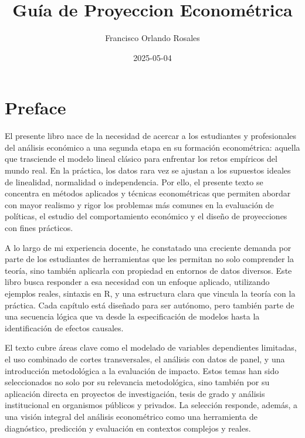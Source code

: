 \documentclass[
  letterpaper,
  DIV=11,
  numbers=noendperiod]{scrreprt}
\title{Guía de Proyeccion Econométrica}
\author{Francisco Orlando Rosales}
\date{2025-05-04}
\renewcommand*\contentsname{Table of contents}
\newcommand\contentsname{Table of contents}
\begin{document}
\maketitle

\renewcommand*\contentsname{Table of contents}
{
\hypersetup{linkcolor=}
\setcounter{tocdepth}{2}
\tableofcontents
}


\chapter*{Preface}\label{preface}


El presente libro nace de la necesidad de acercar a los estudiantes y
profesionales del análisis económico a una segunda etapa en su formación
econométrica: aquella que trasciende el modelo lineal clásico para
enfrentar los retos empíricos del mundo real. En la práctica, los datos
rara vez se ajustan a los supuestos ideales de linealidad, normalidad o
independencia. Por ello, el presente texto se concentra en métodos
aplicados y técnicas econométricas que permiten abordar con mayor
realismo y rigor los problemas más comunes en la evaluación de
políticas, el estudio del comportamiento económico y el diseño de
proyecciones con fines prácticos.

A lo largo de mi experiencia docente, he constatado una creciente
demanda por parte de los estudiantes de herramientas que les permitan no
solo comprender la teoría, sino también aplicarla con propiedad en
entornos de datos diversos. Este libro busca responder a esa necesidad
con un enfoque aplicado, utilizando ejemplos reales, sintaxis en R, y
una estructura clara que vincula la teoría con la práctica. Cada
capítulo está diseñado para ser autónomo, pero también parte de una
secuencia lógica que va desde la especificación de modelos hasta la
identificación de efectos causales.

El texto cubre áreas clave como el modelado de variables dependientes
limitadas, el uso combinado de cortes transversales, el análisis con
datos de panel, y una introducción metodológica a la evaluación de
impacto. Estos temas han sido seleccionados no solo por su relevancia
metodológica, sino también por su aplicación directa en proyectos de
investigación, tesis de grado y análisis institucional en organismos
públicos y privados. La selección responde, además, a una visión
integral del análisis econométrico como una herramienta de diagnóstico,
predicción y evaluación en contextos complejos y reales.
\end{document}
